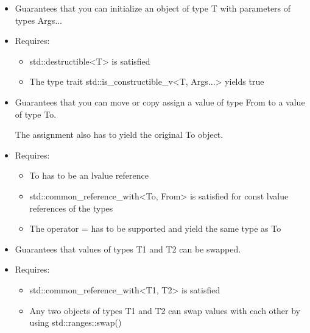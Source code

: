 
\begin{itemize}
\item
Guarantees that you can initialize an object of type T with parameters of types Args...

\item
Requires:
\begin{itemize}
\item
std::destructible<T> is satisfied

\item
The type trait std::is\_constructible\_v<T, Args...> yields true
\end{itemize}
\end{itemize}


\begin{itemize}
\item
Guarantees that you can move or copy assign a value of type From to a value of type To.

The assignment also has to yield the original To object.

\item
Requires:
\begin{itemize}
\item
To has to be an lvalue reference

\item
std::common\_reference\_with<To, From> is satisfied for const lvalue references of the types

\item
The operator = has to be supported and yield the same type as To
\end{itemize}
\end{itemize}


\begin{itemize}
\item
Guarantees that values of types T1 and T2 can be swapped.

\item
Requires:
\begin{itemize}
\item
std::common\_reference\_with<T1, T2> is satisfied

\item
Any two objects of types T1 and T2 can swap values with each other by using std::ranges::swap()
\end{itemize}
\end{itemize}

